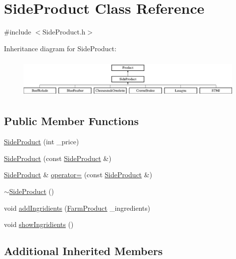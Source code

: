 \hypertarget{classSideProduct}{}\section{Side\+Product Class Reference}
\label{classSideProduct}


{\ttfamily \#include $<$Side\+Product.\+h$>$}

Inheritance diagram for Side\+Product\+:\begin{figure}[H]
\begin{center}
\leavevmode
\includegraphics[height=1.985816cm]{classSideProduct}
\end{center}
\end{figure}
\subsection*{Public Member Functions}
\begin{DoxyCompactItemize}
\item 
\mbox{\hyperlink{classSideProduct_a78f9a12ca66e9a65a6a689e3dbb34d66}{Side\+Product}} (int \+\_\+price)
\item 
\mbox{\hyperlink{classSideProduct_a6ee21911446be5c97997d8b2b64fc80b}{Side\+Product}} (const \mbox{\hyperlink{classSideProduct}{Side\+Product}} \&)
\item 
\mbox{\hyperlink{classSideProduct}{Side\+Product}} \& \mbox{\hyperlink{classSideProduct_aaa352e295cececc88e51656786435089}{operator=}} (const \mbox{\hyperlink{classSideProduct}{Side\+Product}} \&)
\item 
\mbox{\hyperlink{classSideProduct_a9a54de9d2c9da9ca6ab416f7ae50e75d}{$\sim$\+Side\+Product}} ()
\item 
void \mbox{\hyperlink{classSideProduct_af2636d33dc1ef69665c34254d64a676b}{add\+Ingridients}} (\mbox{\hyperlink{classFarmProduct}{Farm\+Product}} \+\_\+ingredients)
\item 
void \mbox{\hyperlink{classSideProduct_ad192ac2e64326fc728635ecf6ac1e45a}{show\+Ingridients}} ()
\end{DoxyCompactItemize}
\subsection*{Additional Inherited Members}


